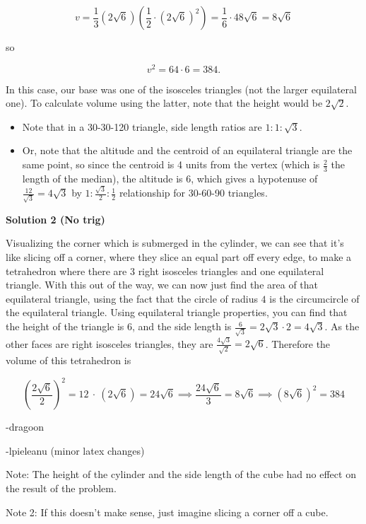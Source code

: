 \begin{enumerate}
 
 \[v = \frac{1}{3}(2\sqrt{6})\left(\frac{1}{2} \cdot (2\sqrt{6})^2\right) = \frac{1}{6} \cdot 48\sqrt{6} = 8\sqrt{6}\]

 so 

 
 \[v^2 = 64 \cdot 6 = \boxed{384}.\]

 In this case, our base was one of the isosceles triangles (not the larger equilateral one). To calculate volume using the latter, note that the height would be $2\sqrt{2}$.

 
            \begin{itemize}
        \item Note that in a 30-30-120 triangle, side length ratios are $1:1:\sqrt{3}$.
        \item Or, note that the altitude and the centroid of an equilateral triangle are the same point, so since the centroid is 4 units from the vertex (which is $\frac{2}{3}$ the length of the median), the altitude is 6, which gives a hypotenuse of $\frac{12}{\sqrt{3}}=4\sqrt{3}$ by $1:\frac{\sqrt{3}}{2}:\frac{1}{2}$ relationship for 30-60-90 triangles.
            \end{itemize}
            



\textbf{Solution 2 (No trig)}

Visualizing the corner which is submerged in the cylinder, we can see that it's like slicing off a corner, where they slice an equal part off every edge, to make a tetrahedron where there are 3 right isosceles triangles and one equilateral triangle. With this out of the way, we can now just find the area of that equilateral triangle, using the fact that the circle of radius $4$ is the circumcircle of the equilateral triangle. Using equilateral triangle properties, you can find that the height of the triangle is $6$, and the side length is $\frac{6}{\sqrt{3}}=2\sqrt{3} \cdot 2=4\sqrt{3}$. As the other faces are right isosceles triangles, they are $\frac{4\sqrt{3}}{\sqrt{2}}=2\sqrt{6}$. Therefore the volume of this tetrahedron is

 
 \[\left(\frac{2\sqrt{6}}{2}\right)^2=12 \ \cdot \ (2\sqrt{6})=24\sqrt{6} \implies \frac{24\sqrt{6}}{3}=8\sqrt{6} \implies (8\sqrt{6})^2=\boxed{384}\]

 -dragoon

 -lpieleanu (minor latex changes)

 
Note: The height of the cylinder and the side length of the cube had no effect on the result of the problem.

 Note 2: If this doesn’t make sense, just imagine slicing a corner off a cube.


\end{enumerate}
